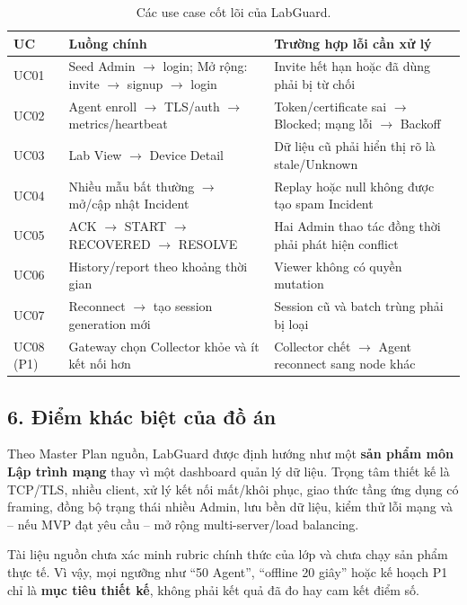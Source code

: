 \begin{table}[!ht]
\centering
\caption{Các use case cốt lõi của LabGuard.}
\label{tab:usecases}
\small
\begin{tabularx}{\textwidth}{p{1.2cm} X X}
\toprule
\textbf{UC} & \textbf{Luồng chính} & \textbf{Trường hợp lỗi cần xử lý} \\
\midrule
UC01 & Seed Admin $\rightarrow$ login; Mở rộng: invite $\rightarrow$ signup $\rightarrow$ login & Invite hết hạn hoặc đã dùng phải bị từ chối \\
UC02 & Agent enroll $\rightarrow$ TLS/auth $\rightarrow$ metrics/heartbeat & Token/certificate sai $\rightarrow$ Blocked; mạng lỗi $\rightarrow$ Backoff \\
UC03 & Lab View $\rightarrow$ Device Detail & Dữ liệu cũ phải hiển thị rõ là stale/Unknown \\
UC04 & Nhiều mẫu bất thường $\rightarrow$ mở/cập nhật Incident & Replay hoặc null không được tạo spam Incident \\
UC05 & ACK $\rightarrow$ START $\rightarrow$ RECOVERED $\rightarrow$ RESOLVE & Hai Admin thao tác đồng thời phải phát hiện conflict \\
UC06 & History/report theo khoảng thời gian & Viewer không có quyền mutation \\
UC07 & Reconnect $\rightarrow$ tạo session generation mới & Session cũ và batch trùng phải bị loại \\
UC08 (P1) & Gateway chọn Collector khỏe và ít kết nối hơn & Collector chết $\rightarrow$ Agent reconnect sang node khác \\
\bottomrule
\end{tabularx}
\end{table}

\subsection*{6. Điểm khác biệt của đồ án}

Theo Master Plan nguồn, LabGuard được định hướng như một \textbf{sản phẩm môn Lập trình mạng} thay vì một dashboard quản lý dữ liệu. Trọng tâm thiết kế là TCP/TLS, nhiều client, xử lý kết nối mất/khôi phục, giao thức tầng ứng dụng có framing, đồng bộ trạng thái nhiều Admin, lưu bền dữ liệu, kiểm thử lỗi mạng và -- nếu MVP đạt yêu cầu -- mở rộng multi-server/load balancing.

\begin{warningbox}
Tài liệu nguồn chưa xác minh rubric chính thức của lớp và chưa chạy sản phẩm thực tế. Vì vậy, mọi ngưỡng như ``50 Agent'', ``offline 20 giây'' hoặc kế hoạch P1 chỉ là \textbf{mục tiêu thiết kế}, không phải kết quả đã đo hay cam kết điểm số.
\end{warningbox}
